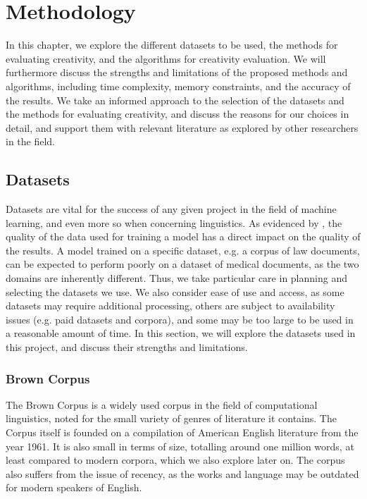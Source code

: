 \chapter{Methodology}
\label{chap:methods}

In this chapter, we explore the different datasets to be used, the methods for evaluating creativity, and the algorithms for creativity evaluation. We will furthermore discuss the strengths and limitations of the proposed methods and algorithms, including time complexity, memory constraints, and the accuracy of the results. We take an informed approach to the selection of the datasets and the methods for evaluating creativity, and discuss the reasons for our choices in detail, and support them with relevant literature as explored by other researchers in the field.

\section{Datasets}
\label{sec:datasets}
Datasets are vital for the success of any given project in the field of machine learning, and even more so when concerning linguistics. As evidenced by \cite{torralba_unbiased_2011}, the quality of the data used for training a model has a direct impact on the quality of the results. A model trained on a specific dataset, e.g. a corpus of law documents, can be expected to perform poorly on a dataset of medical documents, as the two domains are inherently different. Thus, we take particular care in planning and selecting the datasets we use. We also consider ease of use and access, as some datasets may require additional processing, others are subject to availability issues (e.g. paid datasets and corpora), and some may be too large to be used in a reasonable amount of time.
In this section, we will explore the datasets used in this project, and discuss their strengths and limitations.
\subsection{Brown Corpus}
The Brown Corpus \citep*{francis1979brown} is a widely used corpus in the field of computational linguistics, noted for the small variety of genres of literature it contains. The Corpus itself is founded on a compilation of American English literature from the year 1961. It is also small in terms of size, totalling around one million words, at least compared to modern corpora, which we also explore later on. The corpus also suffers from the issue of recency, as the works and language may be outdated for modern speakers of English.

